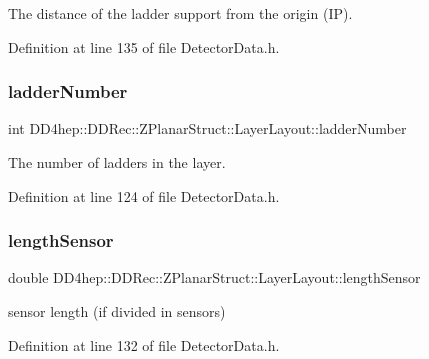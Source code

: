 The distance of the ladder support from the origin (IP). 



Definition at line 135 of file Detector\+Data.\+h.

\hypertarget{struct_d_d4hep_1_1_d_d_rec_1_1_z_planar_struct_1_1_layer_layout_ae351fc83c681934cc2bd3b9032224392}{}\label{struct_d_d4hep_1_1_d_d_rec_1_1_z_planar_struct_1_1_layer_layout_ae351fc83c681934cc2bd3b9032224392} 
\subsubsection{\texorpdfstring{ladder\+Number}{ladderNumber}}
{\footnotesize\ttfamily int D\+D4hep\+::\+D\+D\+Rec\+::\+Z\+Planar\+Struct\+::\+Layer\+Layout\+::ladder\+Number}



The number of ladders in the layer. 



Definition at line 124 of file Detector\+Data.\+h.

\hypertarget{struct_d_d4hep_1_1_d_d_rec_1_1_z_planar_struct_1_1_layer_layout_a9ad59213381cec4c5f5bfb7c8a5e8763}{}\label{struct_d_d4hep_1_1_d_d_rec_1_1_z_planar_struct_1_1_layer_layout_a9ad59213381cec4c5f5bfb7c8a5e8763} 
\subsubsection{\texorpdfstring{length\+Sensor}{lengthSensor}}
{\footnotesize\ttfamily double D\+D4hep\+::\+D\+D\+Rec\+::\+Z\+Planar\+Struct\+::\+Layer\+Layout\+::length\+Sensor}



sensor length (if divided in sensors) 



Definition at line 132 of file Detector\+Data.\+h.

